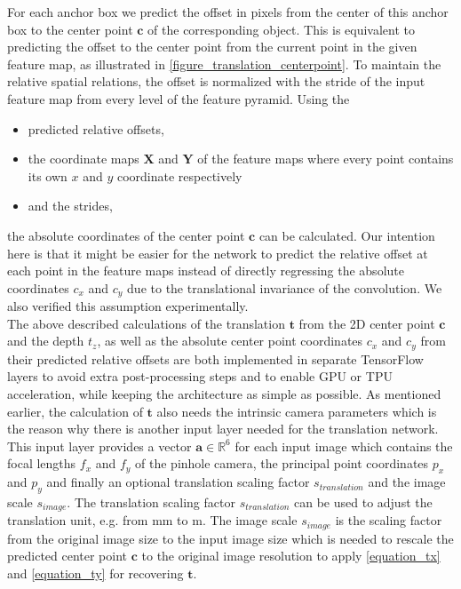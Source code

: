 \documentclass[twocolumn, 10pt, letterpaper]{article}
\begin{document}
For each anchor box we predict the offset in pixels from the center of this anchor box to the center point $\textbf{c}$ of the corresponding object. This is equivalent to predicting the offset to the center point from the current point in the given feature map, as illustrated in \autoref{figure_translation_centerpoint}. To maintain the relative spatial relations, the offset is normalized with the stride of the input feature map from every level of the feature pyramid. Using the 
\begin{itemize}
	\item predicted relative offsets,
	\item the coordinate maps $\textbf{X}$ and $\textbf{Y}$ of the feature maps where every point contains its own $x$ and $y$ coordinate respectively
	\item and the strides,
\end{itemize}
the absolute coordinates of the center point $\textbf{c}$ can be calculated. Our intention here is that it might be easier for the network to predict the relative offset at each point in the feature maps instead of directly regressing the absolute coordinates $c_x$ and $c_y$ due to the translational invariance of the convolution. We also verified this assumption experimentally.\\

The above described calculations of the translation $\textbf{t}$ from the 2D center point $\textbf{c}$ and the depth $t_z$, as well as the absolute center point coordinates $c_x$ and $c_y$ from their predicted relative offsets are both implemented in separate TensorFlow\cite{TensorFlow} layers to avoid extra post-processing steps and to enable GPU or TPU acceleration, while keeping the architecture as simple as possible. As mentioned earlier, the calculation of $\textbf{t}$ also needs the intrinsic camera parameters which is the reason why there is another input layer needed for the translation network. This input layer provides a vector $\textbf{a} \in \mathbb{R}^6$ for each input image which contains the focal lengths $f_x$ and $f_y$ of the pinhole camera, the principal point coordinates $p_x$ and $p_y$ and finally an optional translation scaling factor $s_{translation}$ and the image scale $s_{image}$. The translation scaling factor $s_{translation}$ can be used to adjust the translation unit, e.g. from mm to m. The image scale $s_{image}$ is the scaling factor from the original image size to the input image size which is needed to rescale the predicted center point $\textbf{c}$ to the original image resolution to apply \autoref{equation_tx} and \autoref{equation_ty} for recovering $\textbf{t}$.
\end{document}
